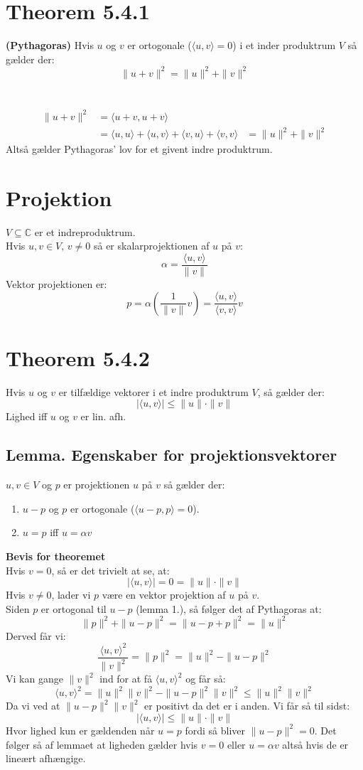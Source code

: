 \documentclass[a4paper,oneside,article]{memoir}
\newcommand{\inner}[2]{\langle #1,#2 \rangle}
\begin{document}
	\section{Theorem 5.4.1}
	\textbf{(Pythagoras)} Hvis $u$ og $v$ er ortogonale 
	($\inner{u}{v}=0$) i et inder produktrum $V$ så gælder der:
	$$\|u+v\|^2=\|u\|^2+\|v\|^2$$
	\\
	\\
	\begin{align*}
	\|u+v\|^2&=\inner{u+v}{u+v}\\
	&= \inner{u}{u} + \inner{u}{v} + \inner{v}{u} + \inner{v}{v}
	&= \|u\|^2+\|v\|^2
	\end{align*}
	Altså gælder Pythagoras' lov for et givent indre produktrum.
	
	\section{Projektion}
	$V\subseteq \mathbb{C}$ er et indreproduktrum.\\
	Hvis $u,v\in V,\, v\neq 0$ så er skalarprojektionen af
	$u$ på $v$:
	$$\alpha = \frac{\inner{u}{v}}{\|v\|}$$
	Vektor projektionen er:
	$$p = \alpha\left(\frac{1}{\|v\|}v\right) = 
	\frac{\inner{u}{v}}{\inner{v}{v}}v$$
	
	\section{Theorem 5.4.2}
	Hvis $u$ og $v$ er tilfældige vektorer i et indre
	produktrum $V$, så gælder der:
	$$|\inner{u}{v}|\leq \|u\|\cdot\|v\|$$
	Lighed iff $u$ og $v$ er lin. afh.
	
	\subsection{Lemma. Egenskaber for projektionsvektorer}
	$u,v\in V$ og $p$ er projektionen $u$ på $v$ så gælder der:
	\begin{enumerate}
	\item $u-p$ og $p$ er ortogonale ($\inner{u-p}{p}=0$).
	\item $u=p$ iff $u=\alpha v$
	\end{enumerate}
	
	\textbf{Bevis for theoremet}\\
	Hvis $v=0$, så er det trivielt at se, at:
	$$|\inner{u}{v}|=0=\|u\|\cdot \|v\|$$
	Hvis $v\neq 0$, lader vi $p$ være en vektor
	projektion af $u$ på $v$.\\
	Siden $p$ er ortogonal til $u-p$ (lemma 1.),
	så følger det af Pythagoras at:
	$$\|p\|^2+\|u-p\|^2=\|u-p+p\|^2=\|u\|^2$$
	Derved får vi:
	$$\frac{\inner{u}{v}^2}{\|v\|^2}=\|p\|^2=\|u\|^2-\|u-p\|^2$$
	Vi kan gange $\|v\|^2$ ind for at få $\inner{u}{v}^2$
	og får så:
	$$\inner{u}{v}^2=\|u\|^2\|v\|^2-\|u-p\|^2\|v\|^2\leq \|u\|^2\|v\|^2$$
	Da vi ved at $\|u-p\|^2\|v\|^2$ er positivt 
	da det er i anden. Vi får så til sidst:
	$$|\inner{u}{v}|\leq\|u\|\cdot\|v\|$$
	Hvor lighed kun er gældenden når $u=p$ fordi
	så bliver $\|u-p\|^2=0$. Det følger så af
	lemmaet at ligheden gælder hvis $v=0$ eller
	$u=\alpha v$ altså hvis de er lineært afhængige.
	
\end{document}

